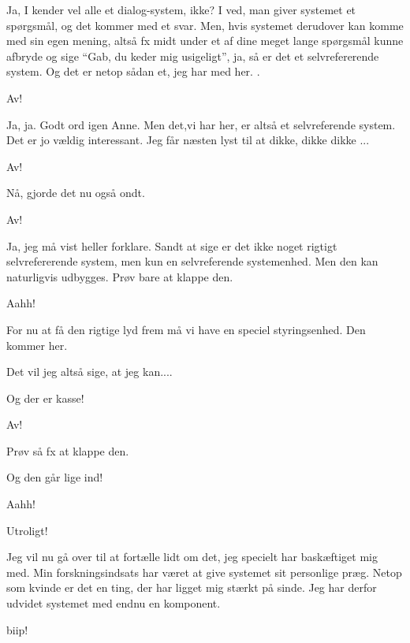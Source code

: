 \documentclass[a4paper,11pt]{article}
\begin{document}
\begin{sketch}
 Ja, I kender vel alle et dialog-system, ikke? I ved, man giver
systemet et spørgsmål, og det kommer med et svar. Men, hvis systemet derudover
kan komme med sin egen mening, altså fx  midt under et
af dine meget lange spørgsmål kunne afbryde og sige ``Gab, du keder mig
usigeligt'', ja, så er det et selvrefererende system. Og det er netop sådan et,
jeg har med her. .

 Av!

 Ja, ja.  Godt ord igen Anne. Men  det,vi har her, er altså
et selvreferende system. Det er jo vældig interessant. Jeg får næsten lyst til
at  dikke, dikke dikke ...

 Av!

  Nå, gjorde det nu også ondt. 

 Av!

 Ja, jeg må vist heller forklare.  Sandt at sige er det ikke noget
rigtigt selvrefererende system, men kun en selvreferende systemenhed. Men den
kan naturligvis udbygges.  Prøv bare at klappe den. 

 Aahh!

 For nu at få den rigtige lyd frem må vi have en speciel
styringsenhed. Den kommer her. 

 Det vil jeg altså sige, at jeg kan.... 

 Og der er kasse! 

 Av!

 Prøv så fx at klappe den. 

 Og den går lige ind! 

 Aahh!

 Utroligt!

 Jeg vil nu gå over til at fortælle lidt om det, jeg specielt har
baskæftiget mig med. Min forskningsindsats har været at give systemet sit
personlige præg. Netop som kvinde er det en ting, der har ligget mig stærkt på
sinde. Jeg har derfor udvidet systemet med endnu en komponent. 

  biip!


\end{sketch}
\end{document}
